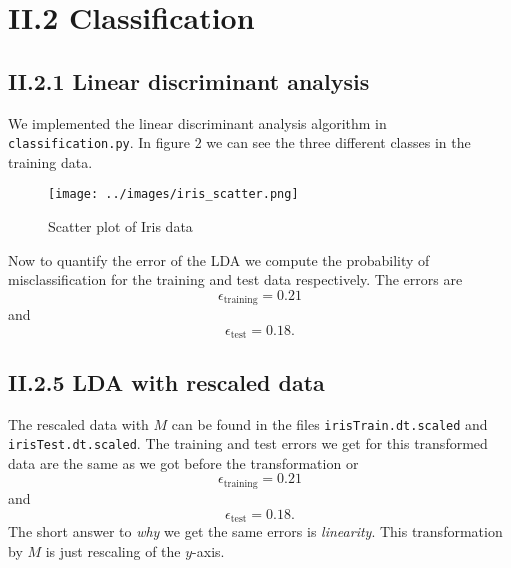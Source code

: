 \documentclass[a4paper,10pt]{article}
\begin{document}
\section*{II.2 Classification}

\subsection*{II.2.1 Linear discriminant analysis}

We implemented the linear discriminant analysis algorithm in \verb=classification.py=. In figure $2$ we can see the three different classes in the training data.
\begin{figure}[H]
	\centering
  		\centering
  		\texttt{[image: ../images/iris\_scatter.png]}
  		\caption{Scatter plot of Iris data}
\end{figure}
Now to quantify the error of the LDA we compute the probability of misclassification for the training and test data respectively. The errors are
$$\epsilon_{\text{training}} = 0.21$$
and
$$\epsilon_{\text{test}} = 0.18.$$

\subsection*{II.2.5 LDA with rescaled data}

The rescaled data with $M$ can be found in the files \verb=irisTrain.dt.scaled= and \verb=irisTest.dt.scaled=. The training and test errors we get for this transformed data are the same as we got before the transformation or 
$$\epsilon_{\text{training}} = 0.21$$
and
$$\epsilon_{\text{test}} = 0.18.$$
The short answer to \emph{why} we get the same errors is \emph{linearity}. This transformation by $M$ is just rescaling of the $y$-axis.


\begin{comment}
\begin{figure}[H]
	\centering
	\begin{subfigure}{0.45\textwidth}
  		\centering
  		\texttt{[image: ../week4/images/prob41asurf.png]}
  		\caption{$x=(0,-1)$}
  \end{subfigure}
  \begin{subfigure}{0.45\textwidth}
  		\centering
  		\texttt{[image: ../week4/images/prob41bsurf.png]}
  		\caption{$x=(0,0.05)$}
  \end{subfigure}
  	\caption{Surface plots of $m(p)$ at different points}
\end{figure}
\end{comment}
\end{document}
